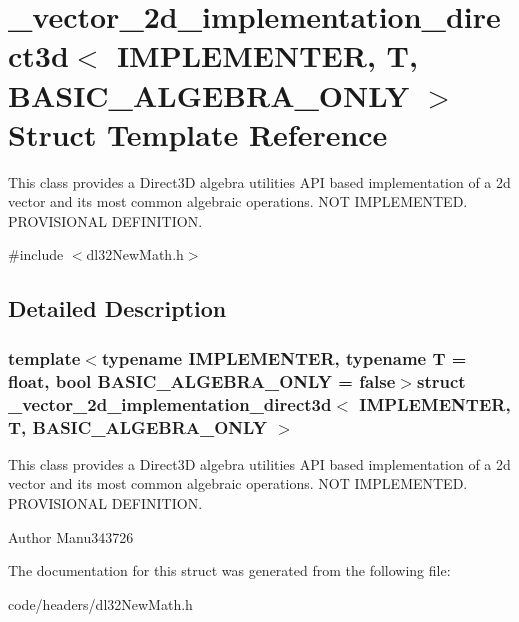 \hypertarget{struct__vector__2d__implementation__direct3d}{\section{\-\_\-vector\-\_\-2d\-\_\-implementation\-\_\-direct3d$<$ I\-M\-P\-L\-E\-M\-E\-N\-T\-E\-R, T, B\-A\-S\-I\-C\-\_\-\-A\-L\-G\-E\-B\-R\-A\-\_\-\-O\-N\-L\-Y $>$ Struct Template Reference}
\label{struct__vector__2d__implementation__direct3d}
}


This class provides a Direct3\-D algebra utilities A\-P\-I based implementation of a 2d vector and its most common algebraic operations. N\-O\-T I\-M\-P\-L\-E\-M\-E\-N\-T\-E\-D. P\-R\-O\-V\-I\-S\-I\-O\-N\-A\-L D\-E\-F\-I\-N\-I\-T\-I\-O\-N.  




{\ttfamily \#include $<$dl32\-New\-Math.\-h$>$}



\subsection{Detailed Description}
\subsubsection*{template$<$typename I\-M\-P\-L\-E\-M\-E\-N\-T\-E\-R, typename T = float, bool B\-A\-S\-I\-C\-\_\-\-A\-L\-G\-E\-B\-R\-A\-\_\-\-O\-N\-L\-Y = false$>$struct \-\_\-vector\-\_\-2d\-\_\-implementation\-\_\-direct3d$<$ I\-M\-P\-L\-E\-M\-E\-N\-T\-E\-R, T, B\-A\-S\-I\-C\-\_\-\-A\-L\-G\-E\-B\-R\-A\-\_\-\-O\-N\-L\-Y $>$}

This class provides a Direct3\-D algebra utilities A\-P\-I based implementation of a 2d vector and its most common algebraic operations. N\-O\-T I\-M\-P\-L\-E\-M\-E\-N\-T\-E\-D. P\-R\-O\-V\-I\-S\-I\-O\-N\-A\-L D\-E\-F\-I\-N\-I\-T\-I\-O\-N. 

\begin{DoxyAuthor}{Author}
Manu343726 
\end{DoxyAuthor}


The documentation for this struct was generated from the following file\-:\begin{DoxyCompactItemize}
\item 
code/headers/dl32\-New\-Math.\-h\end{DoxyCompactItemize}
